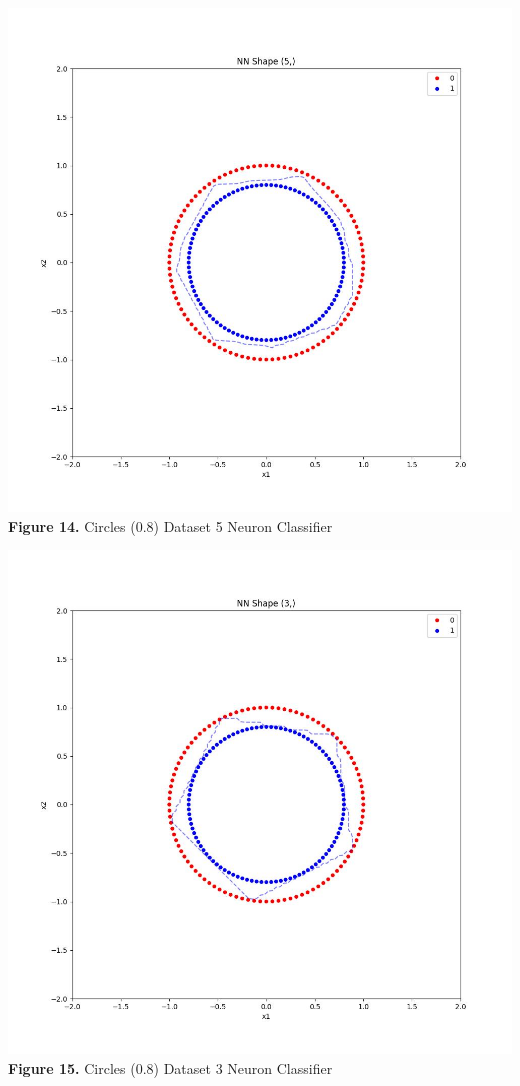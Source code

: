 \documentclass[11pt]{article}
\begin{document}
\includegraphics{figures/cir08_5_clf.jpg}\\
\textbf{Figure 14.} Circles (0.8) Dataset 5 Neuron Classifier

\includegraphics{figures/cir08_3_clf.jpg}\\
\textbf{Figure 15.} Circles (0.8) Dataset 3 Neuron Classifier
\end{document}
